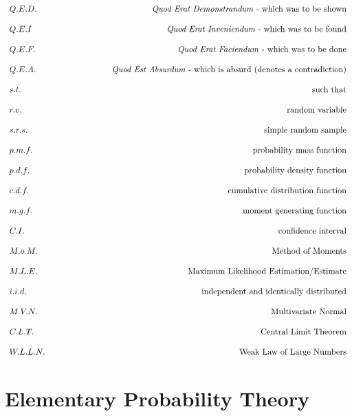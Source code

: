 \documentclass[12pt,a4paper]{article}
\begin{document}
$$\begin{array}{lr}
Q.E.D. & \mbox{\textit{Quod Erat Demonstrandum} - which was to be shown}\\
 & \\
Q.E.I & \mbox{\textit{Quod Erat Inveniendum} - which was to be found}\\
 & \\
Q.E.F. & \mbox{\textit{Quod Erat Faciendum} - which was to be done}\\
 & \\
Q.E.A.\qquad\qquad &\qquad\qquad \mbox{\textit{Quod Est Absurdum} - which is absurd (denotes a contradiction)}\\
 & \\
s.t. & \mbox{such that}\\
 & \\
r.v. & \mbox{random variable}\\
 & \\
s.r.s. & \mbox{simple random sample}\\
 & \\
p.m.f. & \mbox{probability mass function}\\
 & \\
p.d.f. & \mbox{probability density function}\\
 & \\
c.d.f. & \mbox{cumulative distribution function}\\
 & \\
m.g.f. & \mbox{moment generating function}\\
 & \\
C.I. & \mbox{confidence interval}\\
 & \\
M.o.M. & \mbox{Method of Moments}\\
 & \\
M.L.E. & \mbox{Maximum Likelihood Estimation/Estimate}\\
 & \\
i.i.d. & \mbox{independent and identically distributed}\\
 & \\
M.V.N. & \mbox{Multivariate Normal}\\
 & \\
C.L.T. & \mbox{Central Limit Theorem}\\
 & \\
W.L.L.N. & \mbox{Weak Law of Large Numbers}
\end{array}$$

\clearpage
\section{Elementary Probability Theory}
\end{document}
